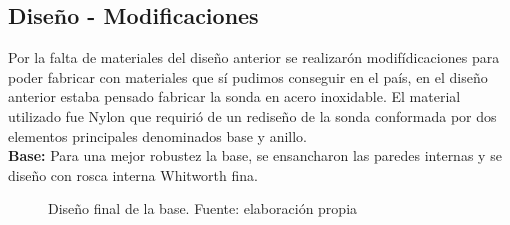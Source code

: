 \begin{appendices}
\subsection{Diseño - Modificaciones}
Por la falta de materiales del diseño anterior se realizar\'on modif\'idicaciones para poder fabricar con materiales que s\'i pudimos conseguir en el pa\'is, en el diseño anterior estaba pensado fabricar la sonda en acero inoxidable.
El material utilizado fue Nylon que requiri\'o de un rediseño de la sonda conformada por dos elementos principales denominados base y anillo. \\ 

\textbf{Base: }
Para una mejor robustez la base, se ensancharon las paredes internas y se diseño  con  rosca interna Whitworth fina.\\ 
\begin{figure}[h]
\centering
{}
\caption{Dise\~no final de la base. Fuente: elaboración propia}
\label{fig:Base2019}
\end{figure}


\end{appendices}
